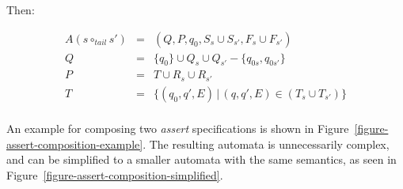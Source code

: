 Then:

\medskip
\[
  \begin{array}{rcl}
    A(s \circ_{tail} s') & = & (Q, P, q_0, S_s \cup S_{s'}, F_s \cup F_{s'}) \\
                       Q & = & \{q_0\} \cup Q_s \cup Q_{s'} - \{q_{0s}, q_{0s'}\} \\
                       P & = & T \cup R_s \cup R_{s'} \\
                       T & = & \{(q_0, q', E) \, | \, (q, q', E) \in (T_s \cup T_{s'})\} \\
  \end{array}
\]
\medskip

An example for composing two \textit{assert} specifications is shown in
Figure~\ref{figure-assert-composition-example}. The resulting automata is
unnecessarily complex, and can be simplified to a smaller automata with the
same semantics, as seen in Figure~\ref{figure-assert-composition-simplified}.


